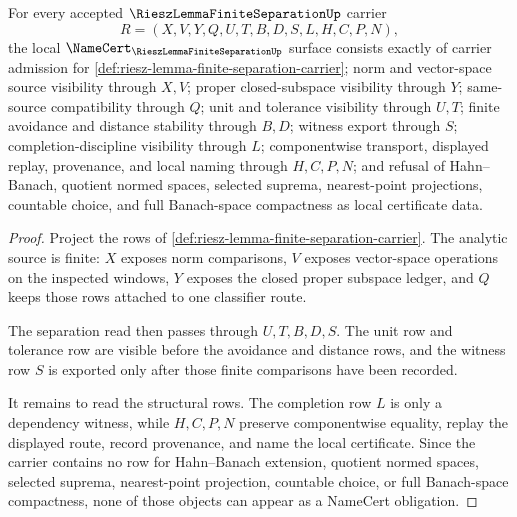 \begin{theorem}
\label{thm:riesz-lemma-finite-separation-namecert-obligations}
For every accepted $\RieszLemmaFiniteSeparationUp$ carrier
$$
R=(X,V,Y,Q,U,T,B,D,S,L,H,C,P,N),
$$
the local $\NameCert_{\RieszLemmaFiniteSeparationUp}$ surface consists exactly of carrier admission for \autoref{def:riesz-lemma-finite-separation-carrier}; norm and vector-space source visibility through $X,V$; proper closed-subspace visibility through $Y$; same-source compatibility through $Q$; unit and tolerance visibility through $U,T$; finite avoidance and distance stability through $B,D$; witness export through $S$; completion-discipline visibility through $L$; componentwise transport, displayed replay, provenance, and local naming through $H,C,P,N$; and refusal of Hahn--Banach, quotient normed spaces, selected suprema, nearest-point projections, countable choice, and full Banach-space compactness as local certificate data.
\end{theorem}
\begin{proof}
Project the rows of \autoref{def:riesz-lemma-finite-separation-carrier}. The analytic source is finite: $X$ exposes norm comparisons, $V$ exposes vector-space operations on the inspected windows, $Y$ exposes the closed proper subspace ledger, and $Q$ keeps those rows attached to one classifier route.

The separation read then passes through $U,T,B,D,S$. The unit row and tolerance row are visible before the avoidance and distance rows, and the witness row $S$ is exported only after those finite comparisons have been recorded.

It remains to read the structural rows. The completion row $L$ is only a dependency witness, while $H,C,P,N$ preserve componentwise equality, replay the displayed route, record provenance, and name the local certificate. Since the carrier contains no row for Hahn--Banach extension, quotient normed spaces, selected suprema, nearest-point projection, countable choice, or full Banach-space compactness, none of those objects can appear as a NameCert obligation.
\end{proof}


